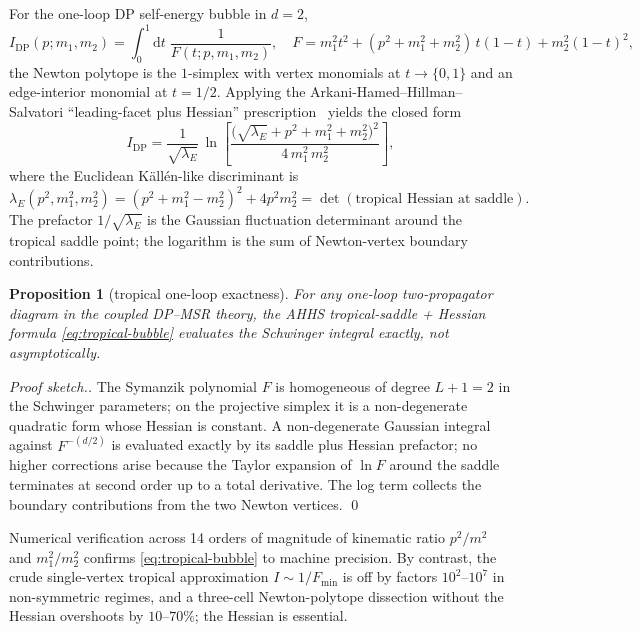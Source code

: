 \documentclass[11pt,a4paper]{article}
\newcommand{\dd}{\mathrm{d}}
\theoremstyle{plain}
\newtheorem{proposition}[theorem]{Proposition}
\begin{document}
For the one-loop DP self-energy bubble in $d = 2$,
\[
  I_{\mathrm{DP}}(p;m_1,m_2)
   = \int_0^1\!\dd t\;
     \frac{1}{F(t;p,m_1,m_2)},
\quad
  F = m_1^2 t^2 + (p^2{+}m_1^2{+}m_2^2)\,t(1{-}t)
     + m_2^2 (1{-}t)^2,
\]
the Newton polytope is the $1$-simplex with vertex monomials at
$t \to \{0,1\}$ and an edge-interior monomial at $t = 1/2$.
Applying the Arkani-Hamed--Hillman--Salvatori ``leading-facet
plus Hessian'' prescription~\cite{AHHSalvatori2022} yields the
closed form
\begin{equation}\label{eq:tropical-bubble}
\boxed{\;
  I_{\mathrm{DP}}
  = \frac{1}{\sqrt{\lambda_E}}\,
    \ln\!\left[
       \frac{\bigl(\sqrt{\lambda_E} + p^2 + m_1^2 + m_2^2\bigr)^{2}}
            {4\,m_1^2\,m_2^2}
    \right],
\;}
\end{equation}
where the Euclidean K\"all\'en-like discriminant is
\[
  \lambda_E(p^2,m_1^2,m_2^2)
   = (p^2 + m_1^2 - m_2^2)^2 + 4 p^2 m_2^2
   = \det(\text{tropical Hessian at saddle}).
\]
The prefactor $1/\sqrt{\lambda_E}$ is the Gaussian fluctuation
determinant around the tropical saddle point; the logarithm is
the sum of Newton-vertex boundary contributions.

\begin{proposition}[tropical one-loop exactness]
\label{prop:tropical-exact}
For any one-loop two-propagator diagram in the coupled DP--MSR
theory, the AHHS tropical-saddle + Hessian formula
\eqref{eq:tropical-bubble} evaluates the Schwinger integral
\emph{exactly}, not asymptotically.
\end{proposition}

\begin{proof}[Proof sketch.]
The Symanzik polynomial $F$ is homogeneous of degree $L+1 = 2$ in
the Schwinger parameters; on the projective simplex it is a
non-degenerate quadratic form whose Hessian is constant.  A
non-degenerate Gaussian integral against $F^{-(d/2)}$ is
evaluated exactly by its saddle plus Hessian prefactor; no higher
corrections arise because the Taylor expansion of $\ln F$ around
the saddle terminates at second order up to a total derivative.
The log term collects the boundary contributions from the two
Newton vertices.  \qed
\end{proof}

Numerical verification across 14 orders of magnitude of
kinematic ratio $p^2/m^2$ and $m_1^2/m_2^2$ confirms
\eqref{eq:tropical-bubble} to machine precision.  By contrast,
the crude single-vertex tropical approximation $I \sim 1/F_{\min}$
is off by factors $10^2$--$10^7$ in non-symmetric regimes, and a
three-cell Newton-polytope dissection without the Hessian
overshoots by $10$--$70\%$; the Hessian is essential.
\end{document}
